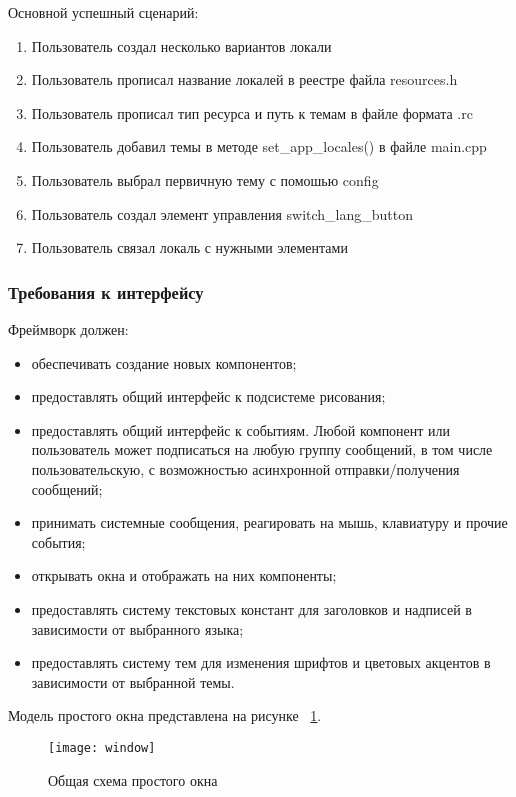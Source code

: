 Основной успешный сценарий:
\begin{enumerate}
	\item Пользователь создал несколько вариантов локали
	\item Пользователь прописал название локалей в реестре файла resources.h
	\item Пользователь прописал тип ресурса и путь к темам в файле формата .rc
	\item Пользователь добавил темы в методе set{\_}app{\_}locales() в файле main.cpp
	\item Пользователь выбрал первичную тему с помошью config
	\item Пользователь создал элемент управления switch{\_}lang{\_}button
	\item Пользователь связал локаль с нужными элементами
\end{enumerate}

\subsubsection{Требования к интерфейсу}
Фреймворк должен:
\begin{itemize}
	\item обеспечивать создание новых компонентов;
	\item предоставлять общий интерфейс к подсистеме рисования;
	\item предоставлять общий интерфейс к событиям. Любой компонент или пользователь может подписаться на любую группу сообщений, в том числе пользовательскую, с возможностью асинхронной отправки/получения сообщений;
	\item принимать системные сообщения, реагировать на мышь, клавиатуру и прочие события;
	\item открывать окна и отображать на них компоненты;
    \item предоставлять систему текстовых констант для заголовков и надписей в зависимости от выбранного языка;
    \item предоставлять систему тем для изменения шрифтов и цветовых акцентов в зависимости от выбранной темы.
\end{itemize}

Модель простого окна представлена на рисунке ~\ref{window:image}.

\begin{figure}[ht]
\texttt{[image: window]}
\caption{Общая схема простого окна}
\label{window:image}
\end{figure}

